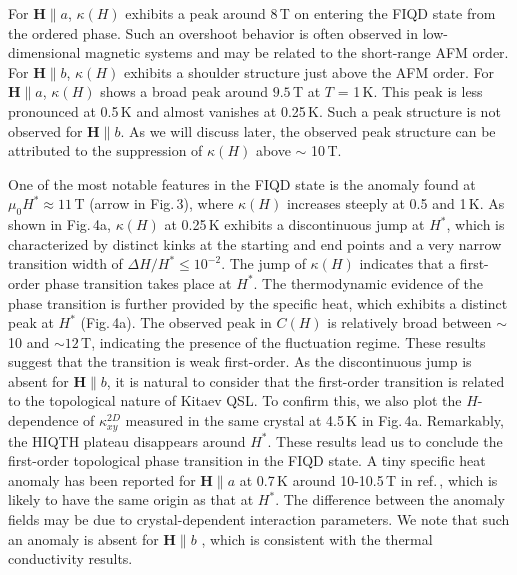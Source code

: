 \documentclass[twocolumn,preprintnumbers,prl,superscriptaddress,amsmath,amssymb,amsfonts]{revtex4}
\begin{document}
For ${\bm H}\parallel a$, $\kappa(H)$ exhibits a peak around 8\,T on entering the FIQD state from the ordered phase. Such an overshoot behavior is often observed in low-dimensional magnetic systems \cite{PhysRevB.87.224413,li2020possible} and may be related to the short-range AFM order. For ${\bm H}\parallel b$, $\kappa(H)$ exhibits a shoulder structure just above the AFM order. For ${\bm H}\parallel a$, $\kappa(H)$ shows a broad peak around $9.5$\,T at $T$ = 1\,K. This peak is less pronounced at 0.5\,K and almost vanishes at 0.25\,K. Such a peak structure is not observed for ${\bm H}\parallel b$. As we will discuss later, the observed peak structure can be attributed to the suppression of $\kappa(H)$ above $\sim$ 10\,T.

One of the most notable features in the FIQD state is the anomaly found at $\mu_0H^*\approx11$\,T (arrow in Fig.\,3), where $\kappa(H)$ increases steeply at 0.5 and 1\,K. As shown in Fig.\,4a, $\kappa(H)$ at 0.25\,K exhibits a discontinuous jump at $H^*$, which is characterized by distinct kinks at the starting and end points and a very narrow transition width of $\Delta H/H^*\leq 10^{-2}$. The jump of $\kappa(H)$ indicates that a first-order phase transition takes place at $H^*$. The thermodynamic evidence of the phase transition is further provided by the specific heat, which exhibits a distinct peak at $H^*$ (Fig.\,4a). The observed peak in $C(H)$ is relatively broad between $\sim$10 and $\sim12$\,T, indicating the presence of the fluctuation regime. These results suggest that the transition is weak first-order. As the discontinuous jump is absent for ${\bm H}\parallel b$, it is natural to consider that the first-order transition is related to the topological nature of Kitaev QSL. To confirm this, we also plot the $H$-dependence of $\kappa_{xy}^{2D}$ measured in the same crystal at 4.5\,K \cite{yokoi2021half} in Fig.\,4a. Remarkably, the HIQTH  plateau disappears around $H^*$. These results lead us to conclude the first-order topological phase transition in the FIQD state. A tiny specific heat anomaly has been reported for $\bm{H}\parallel a$ at 0.7\,K around 10-10.5\,T in ref.\,, which is likely to have the same origin as that at $H^\ast$. The difference between the anomaly fields may be due to crystal-dependent interaction parameters. We note that such an anomaly is absent for $\bm{H}\parallel b$ \cite{tanaka2020thermodynamic}, which is consistent with the thermal conductivity results.
\end{document}
